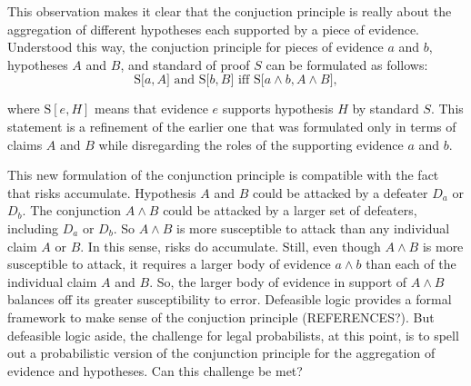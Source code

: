 \documentclass[10pt,dvipsnames,enabledeprecatedfontcommands]{scrartcl}
\begin{document}
This observation makes it clear that the conjuction principle is really
about the aggregation of different hypotheses each supported by a piece
of
evidence.
Understood this way, the conjuction principle for pieces of evidence
\(a\) and \(b\), hypotheses \(A\) and \(B\), and standard of proof \(S\)
can be formulated as follows:
\[\text{S[$a, A$] and S[$b, B$] iff S[$a \wedge b, A\wedge B$]},\]

\noindent
where \(\text{S}[e, H]\) means that evidence \(e\) supports hypothesis
\(H\) by standard \(S\). This statement is a
refinement
of the earlier one that was formulated only in terms of claims \(A\) and
\(B\) while disregarding the roles of the supporting evidence \(a\) and
\(b\).

This new formulation of the conjunction principle is compatible with the
fact that risks
accumulate.
Hypothesis \(A\) and \(B\) could be attacked by a defeater \(D_a\) or
\(D_b\). The conjunction \(A \wedge B\) could be attacked by a larger
set of defeaters, including \(D_a\) or \(D_b\). So \(A \wedge B\) is
more susceptible to attack than any individual claim \(A\) or \(B\). In
this sense, risks do
accumulate.
Still, even though
\(A \wedge B\) is more susceptible to attack, it requires a larger body
of evidence \(a \wedge b\) than each of the individual claim \(A\) and
\(B\). So, the larger body of evidence in support of \(A \wedge B\)
balances off its greater susceptibility to error. Defeasible logic
provides a formal framework to make sense of the conjuction principle
(REFERENCES?). But defeasible logic aside, the challenge for legal
probabilists, at this point, is to spell out a probabilistic version of
the conjunction principle for the aggregation of evidence and
hypotheses. Can this challenge be met?
\end{document}
